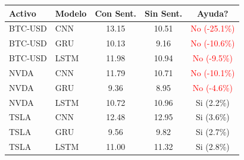 \begin{tabular}{l|l|cc|c}
\hline
\textbf{Activo} & \textbf{Modelo} & \textbf{Con Sent.} & \textbf{Sin Sent.} & \textbf{Ayuda?} \\
\hline
BTC-USD & CNN & 13.15 & 10.51 & \textcolor{red}{No (-25.1\%)} \\
BTC-USD & GRU & 10.13 & 9.16 & \textcolor{red}{No (-10.6\%)} \\
BTC-USD & LSTM & 11.98 & 10.94 & \textcolor{red}{No (-9.5\%)} \\
NVDA & CNN & 11.79 & 10.71 & \textcolor{red}{No (-10.1\%)} \\
NVDA & GRU & 9.36 & 8.95 & \textcolor{red}{No (-4.6\%)} \\
NVDA & LSTM & 10.72 & 10.96 & \textcolor{green!60!black}{Si (2.2\%)} \\
TSLA & CNN & 12.48 & 12.95 & \textcolor{green!60!black}{Si (3.6\%)} \\
TSLA & GRU & 9.56 & 9.82 & \textcolor{green!60!black}{Si (2.7\%)} \\
TSLA & LSTM & 11.00 & 11.32 & \textcolor{green!60!black}{Si (2.8\%)} \\
\hline
\end{tabular}
